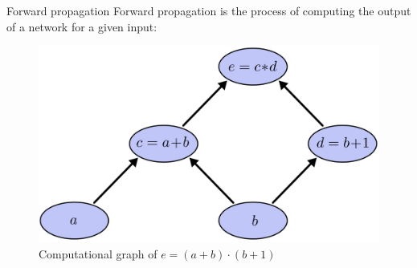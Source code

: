 \documentclass[12pt]{beamer}
\begin{document}
\begin{frame}{Forward propagation}
Forward propagation is  the process of computing the output of a network for a given input:



\begin{figure}
\centering
\includegraphics[width = 0.6\linewidth]{images/backprop1.png}
\caption{Computational graph of $e = (a+b)\cdot (b+1)$}

\label{fig:propagation}
\end{figure}
\end{frame}
\end{document}
